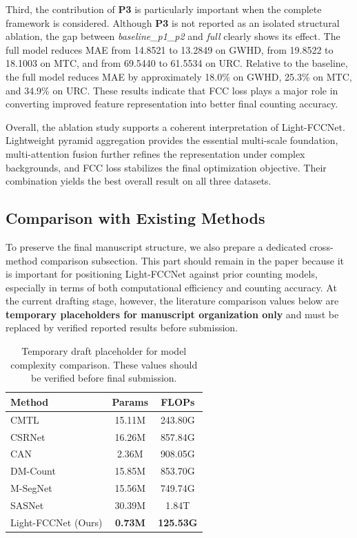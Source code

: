 \documentclass[a4paper,fleqn]{cas-sc}
\begin{document}
Third, the contribution of \textbf{P3} is particularly important when the complete framework is considered. Although \textbf{P3} is not reported as an isolated structural ablation, the gap between \textit{baseline\_p1\_p2} and \textit{full} clearly shows its effect. The full model reduces MAE from 14.8521 to 13.2849 on GWHD, from 19.8522 to 18.1003 on MTC, and from 69.5440 to 61.5534 on URC. Relative to the baseline, the full model reduces MAE by approximately 18.0\% on GWHD, 25.3\% on MTC, and 34.9\% on URC. These results indicate that FCC loss plays a major role in converting improved feature representation into better final counting accuracy.

Overall, the ablation study supports a coherent interpretation of Light-FCCNet. Lightweight pyramid aggregation provides the essential multi-scale foundation, multi-attention fusion further refines the representation under complex backgrounds, and FCC loss stabilizes the final optimization objective. Their combination yields the best overall result on all three datasets.

\subsection{Comparison with Existing Methods}

To preserve the final manuscript structure, we also prepare a dedicated cross-method comparison subsection. This part should remain in the paper because it is important for positioning Light-FCCNet against prior counting models, especially in terms of both computational efficiency and counting accuracy. At the current drafting stage, however, the literature comparison values below are \textbf{temporary placeholders for manuscript organization only} and must be replaced by verified reported results before submission.

\begin{table}[!htbp]
    \centering
    \caption{Temporary draft placeholder for model complexity comparison. These values should be verified before final submission.}
    \label{tab:complexity_placeholder}
    \begin{tabular}{lcc}
        \toprule
        Method & Params & FLOPs \\
        \midrule
        CMTL        & 15.11M & 243.80G \\
        CSRNet      & 16.26M & 857.84G \\
        CAN         & 2.36M  & 908.05G \\
        DM-Count    & 15.85M & 853.70G \\
        M-SegNet    & 15.56M & 749.74G \\
        SASNet      & 30.39M & 1.84T   \\
        Light-FCCNet (Ours) & \textbf{0.73M} & \textbf{125.53G} \\
        \bottomrule
    \end{tabular}
\end{table}
\end{document}

